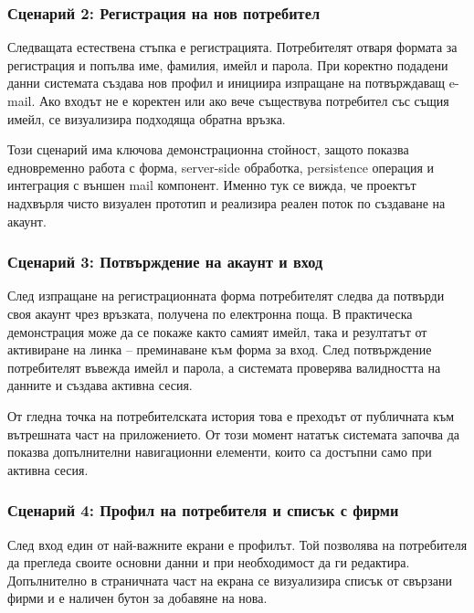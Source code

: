 
\subsubsection{Сценарий 2: Регистрация на нов потребител}

Следващата естествена стъпка е регистрацията. Потребителят отваря формата за регистрация и попълва име, фамилия, имейл и парола. При коректно подадени данни системата създава нов профил и инициира изпращане на потвърждаващ e-mail. Ако входът не е коректен или ако вече съществува потребител със същия имейл, се визуализира подходяща обратна връзка.

Този сценарий има ключова демонстрационна стойност, защото показва едновременно работа с форма, server-side обработка, persistence операция и интеграция с външен mail компонент. Именно тук се вижда, че проектът надхвърля чисто визуален прототип и реализира реален поток по създаване на акаунт.


\subsubsection{Сценарий 3: Потвърждение на акаунт и вход}

След изпращане на регистрационната форма потребителят следва да потвърди своя акаунт чрез връзката, получена по електронна поща. В практическа демонстрация може да се покаже както самият имейл, така и резултатът от активиране на линка -- преминаване към форма за вход. След потвърждение потребителят въвежда имейл и парола, а системата проверява валидността на данните и създава активна сесия.

От гледна точка на потребителската история това е преходът от публичната към вътрешната част на приложението. От този момент нататък системата започва да показва допълнителни навигационни елементи, които са достъпни само при активна сесия.


\subsubsection{Сценарий 4: Профил на потребителя и списък с фирми}

След вход един от най-важните екрани е профилът. Той позволява на потребителя да прегледа своите основни данни и при необходимост да ги редактира. Допълнително в страничната част на екрана се визуализира списък от свързани фирми и е наличен бутон за добавяне на нова.

